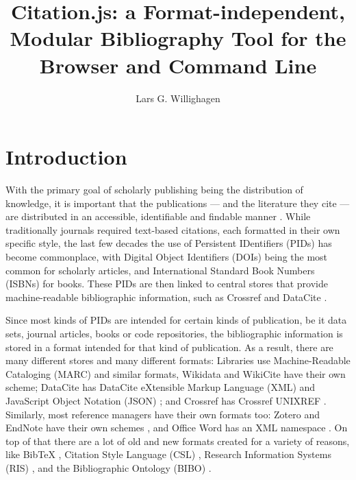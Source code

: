 \documentclass[fleqn,10pt,lineno]{wlpeerj} %
\title{Citation.js: a Format-independent, Modular Bibliography Tool for the Browser and Command Line}
\author[1]{Lars G. Willighagen}
\affil[1]{Eindhoven, The Netherlands}
\begin{document}
\flushbottom
\maketitle
\thispagestyle{empty}

\section*{Introduction}

With the primary goal of scholarly publishing being the distribution of knowledge, it is important that the publications --- and the literature they cite --- are distributed in an accessible, identifiable and findable manner \citep{shotton_publishing:_2013}. While traditionally journals required text-based citations, each formatted in their own specific style, the last few decades the use of Persistent IDentifiers (PIDs) has become commonplace, with Digital Object Identifiers (DOIs) being the most common for scholarly articles, and International Standard Book Numbers (ISBNs) for books. These PIDs are then linked to central stores that provide machine-readable bibliographic information, such as Crossref and DataCite \cite{lammey_crossref_2015,brase_datacite_2009,neumann_datacite_2014}.

Since most kinds of PIDs are intended for certain kinds of publication, be it data sets, journal articles, books or code repositories, the bibliographic information is stored in a format intended for that kind of publication. As a result, there are many different stores and many different formats: Libraries use Machine-Readable Cataloging (MARC) \citep{avram_machine-readable_nodate} and similar formats, Wikidata \citep{vrandecic_getting_2018} and WikiCite \citep{taraborelli_wikicite_2017} have their own scheme; DataCite has DataCite eXtensible Markup Language (XML) and JavaScript Object Notation (JSON) \citep{noauthor_datacite_2017}; and Crossref has Crossref UNIXREF \citep{noauthor_unixref_nodate}. Similarly, most reference managers have their own formats too: Zotero and EndNote have their own schemes \citep{vinckevicius_zotero_2017,noauthor_endnote_nodate}, and Office Word has an XML namespace \citep{noauthor_documentformat.openxml.bibliography_nodate}. On top of that there are a lot of old and new formats created for a variety of reasons, like BibTeX \citep{patashnik_bibtexing_1988}, Citation Style Language (CSL) \citep{zelle_csl_2012}, Research Information Systems (RIS) \citep{noauthor_ris_2012}, and the Bibliographic Ontology (BIBO) \citep{d2009bibliographic}.
\end{document}
